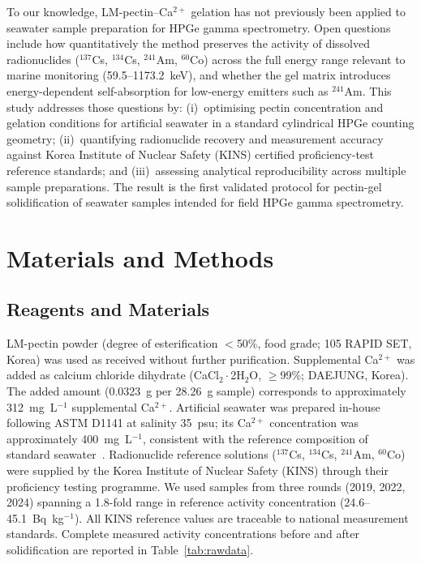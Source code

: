 \documentclass[preprint,12pt]{elsarticle}
\begin{document}
To our knowledge, LM-pectin--Ca$^{2+}$ gelation has not previously been
applied to seawater sample preparation for HPGe gamma spectrometry.
Open questions include how quantitatively the method preserves the activity
of dissolved radionuclides ($^{137}$Cs, $^{134}$Cs, $^{241}$Am, $^{60}$Co)
across the full energy range relevant to marine monitoring (59.5--1173.2~keV),
and whether the gel matrix introduces energy-dependent self-absorption
for low-energy emitters such as $^{241}$Am.
This study addresses those questions by: (i)~optimising pectin concentration
and gelation conditions for artificial seawater in a standard cylindrical
HPGe counting geometry; (ii)~quantifying radionuclide recovery and
measurement accuracy against Korea Institute of Nuclear Safety (KINS)
certified proficiency-test reference standards; and (iii)~assessing
analytical reproducibility across multiple sample preparations.
The result is the first validated protocol for pectin-gel solidification
of seawater samples intended for field HPGe gamma spectrometry.


\section{Materials and Methods}

\subsection{Reagents and Materials}

LM-pectin powder (degree of esterification $<$50\%, food grade;
105 RAPID SET, Korea) was used as received without further purification.
Supplemental Ca$^{2+}$ was added as calcium chloride dihydrate
(CaCl$_2\cdot$2H$_2$O, $\geq$99\%; DAEJUNG, Korea).
The added amount (0.0323~g per 28.26~g sample) corresponds to
approximately 312~mg~L$^{-1}$ supplemental Ca$^{2+}$.
Artificial seawater was prepared in-house following ASTM D1141 at
salinity 35~psu; its Ca$^{2+}$ concentration was approximately
400~mg~L$^{-1}$, consistent with the reference composition of standard
seawater~\cite{Millero2008}.
Radionuclide reference solutions ($^{137}$Cs, $^{134}$Cs, $^{241}$Am,
$^{60}$Co) were supplied by the Korea Institute of Nuclear Safety (KINS)
through their proficiency testing programme.
We used samples from three rounds (2019, 2022, 2024) spanning a 1.8-fold
range in reference activity concentration (24.6--45.1~Bq~kg$^{-1}$).
All KINS reference values are traceable to national measurement standards.
Complete measured activity concentrations before and after solidification
are reported in Table~\ref{tab:rawdata}.
\end{document}

